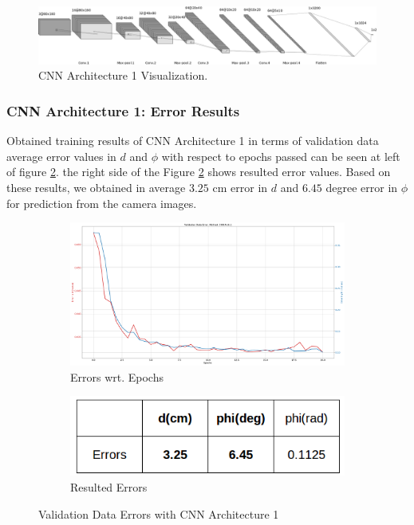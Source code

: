 \documentclass[11pt,letterpaper]{article}
\begin{document}
	\begin{figure}[h!]
		\centering
		\includegraphics[width=1.0\linewidth]{arc1.png}
		\caption{CNN Architecture 1 Visualization.}
		\label{fig:05}
	\end{figure}
	
	\subsubsection{CNN Architecture 1: Error Results}
	Obtained training results of CNN Architecture 1 in terms of validation data average error values in $d$ and $\phi$ with respect to epochs passed can be seen at left of figure \ref{fig:06}. the right side of the Figure \ref{fig:06} shows resulted error values. Based on these results, we obtained in average $3.25$ cm error in $d$ and $6.45$ degree error in $\phi$ for prediction from the camera images. 
	
	\begin{figure}[h!]
		\centering
		\begin{subfigure}[b]{0.74\linewidth}
			\includegraphics[width=\linewidth]{err-arc1.png}
			\caption{Errors wrt. Epochs}
		\end{subfigure}
		\begin{subfigure}[b]{0.24\linewidth}
			\includegraphics[width=\linewidth]{err-arc1-table.png}
			\caption{Resulted Errors}
		\end{subfigure}
		\caption{Validation Data Errors with CNN Architecture 1}
		\label{fig:06}
	\end{figure}  
	
\end{document}

